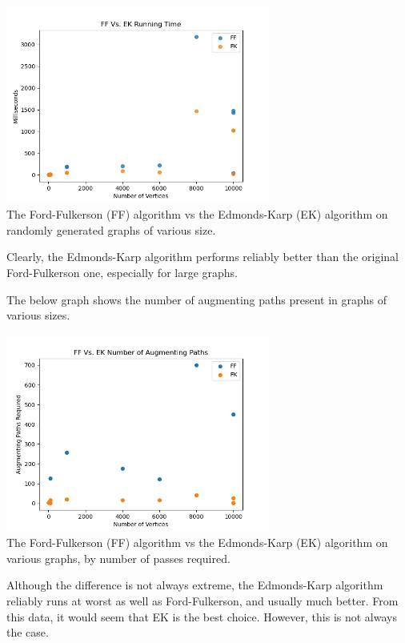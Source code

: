 \documentclass[12pt]{amsart}
\begin{document}
\begin{center}
    \includegraphics[width=0.65\textwidth]{mf_algorithm_comparison} \\
    The Ford-Fulkerson (FF) algorithm vs the Edmonds-Karp (EK)
    algorithm on randomly generated graphs of various size. \\
    \vskip 1cm
\end{center}

    Clearly, the Edmonds-Karp algorithm performs reliably
    better than the original Ford-Fulkerson one, especially for
    large graphs.

    The below graph shows the number of augmenting paths present
    in graphs of various sizes.

\begin{center}
    \includegraphics[width=0.65\textwidth]{mf_passes_comparison.png} \\
    The Ford-Fulkerson (FF) algorithm vs the Edmonds-Karp (EK)
    algorithm on various graphs, by number of passes required. \\
    \vskip 1cm
\end{center}

    Although the difference is not always extreme, the
    Edmonds-Karp algorithm reliably runs at worst as well as
    Ford-Fulkerson, and usually much better. From this data, it
    would seem that EK is the best choice. However, this is not
    always the case.
\end{document}
